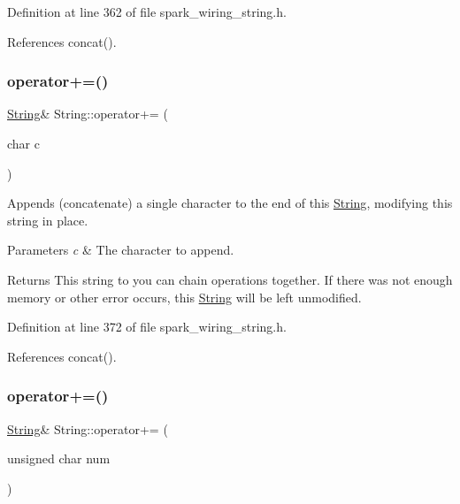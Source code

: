 Definition at line 362 of file spark\+\_\+wiring\+\_\+string.\+h.



References concat().

\mbox{\label{class_string_aea2e862c41c9995a7cb2201cd92c2851}} 
\subsubsection{\texorpdfstring{operator+=()}{operator+=()}\hspace{0.1cm}{\footnotesize\ttfamily [3/8]}}
{\footnotesize\ttfamily \hyperlink{class_string}{String}\& String\+::operator+= (\begin{DoxyParamCaption}\item[{char}]{c }\end{DoxyParamCaption})\hspace{0.3cm}{\ttfamily [inline]}}



Appends (concatenate) a single character to the end of this \hyperlink{class_string}{String}, modifying this string in place. 


\begin{DoxyParams}{Parameters}
{\em c} & The character to append.\\
\hline
\end{DoxyParams}
\begin{DoxyReturn}{Returns}
This string to you can chain operations together. If there was not enough memory or other error occurs, this \hyperlink{class_string}{String} will be left unmodified. 
\end{DoxyReturn}


Definition at line 372 of file spark\+\_\+wiring\+\_\+string.\+h.



References concat().

\mbox{\label{class_string_a26be7d08426b6cf307f1eb2e9bff095a}} 
\subsubsection{\texorpdfstring{operator+=()}{operator+=()}\hspace{0.1cm}{\footnotesize\ttfamily [4/8]}}
{\footnotesize\ttfamily \hyperlink{class_string}{String}\& String\+::operator+= (\begin{DoxyParamCaption}\item[{unsigned char}]{num }\end{DoxyParamCaption})\hspace{0.3cm}{\ttfamily [inline]}}




